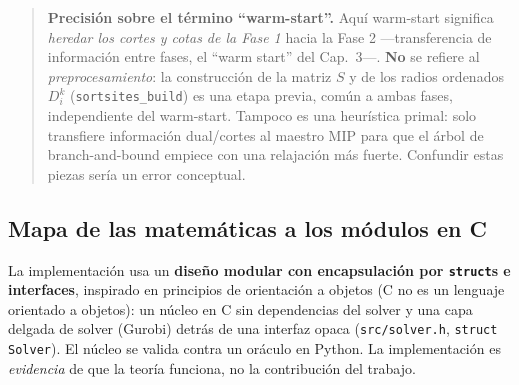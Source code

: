 \begin{quote}
\textbf{Precisión sobre el término ``warm-start''.} Aquí warm-start significa \emph{heredar los
cortes y cotas de la Fase 1} hacia la Fase 2 —transferencia de información entre fases, el
``warm start'' del Cap.~3—. \textbf{No} se refiere al \emph{preprocesamiento}: la construcción de
la matriz $S$ y de los radios ordenados $D^k_i$ (\texttt{sortsites\_build}) es una etapa previa,
común a ambas fases, independiente del warm-start. Tampoco es una heurística primal: solo
transfiere información dual/cortes al maestro MIP para que el árbol de branch-and-bound empiece
con una relajación más fuerte. Confundir estas piezas sería un error conceptual.
\end{quote}

\subsection{Mapa de las matemáticas a los módulos en C}
La implementación usa un \textbf{diseño modular con encapsulación por \texttt{struct}s e
interfaces}, inspirado en principios de orientación a objetos (C no es un lenguaje orientado a
objetos): un núcleo en C sin dependencias del solver y una capa delgada de solver (Gurobi) detrás
de una interfaz opaca (\texttt{src/solver.h}, \texttt{struct Solver}). El núcleo se valida contra
un oráculo en Python. La implementación es \emph{evidencia} de que la teoría funciona, no la
contribución del trabajo.

